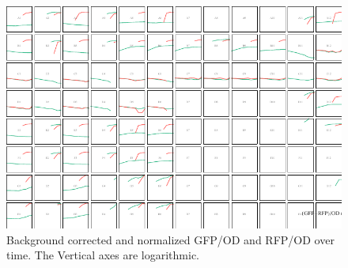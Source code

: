 \documentclass[english,11pt,a4paper]{article}
\begin{document}
\begin{figure}[h]
\centering
\includegraphics[scale=1.5, angle=-90, origin=c]{LogGfpPlusRfpByODCorrectedYMax12.pdf}
\caption{Background corrected and normalized GFP/OD and RFP/OD over time. The Vertical axes are logarithmic.}	
\label{fig:GfpRfpByODLog}
\end{figure}
\end{document}
